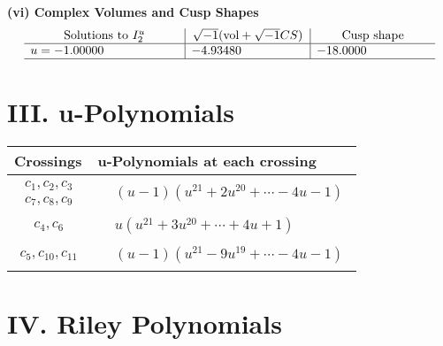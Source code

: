 \documentclass[1p]{elsarticle_modified}
\theoremstyle{definition}
\newcommand{\I}{\sqrt{-1}}
\begin{document}
\newpage\flushleft \textbf{(vi) Complex Volumes and Cusp Shapes}
$$\begin{array}{c|c|c}  
\text{Solutions to }I^u_{2}& \I (\text{vol} + \sqrt{-1}CS) & \text{Cusp shape}\\
 \hline 
\begin{aligned}
u &= -1.00000\phantom{ +0.000000I}\end{aligned}
 & -4.93480\phantom{ +0.000000I} & -18.0000\phantom{ +0.000000I}\\
 \hline 
 \end{array}$$\newpage
\newpage\renewcommand{\arraystretch}{1}
\centering \section*{ III. u-Polynomials}
\begin{tabular}{m{50pt}|m{274pt}}
Crossings & \hspace{64pt}u-Polynomials at each crossing \\
\hline $$\begin{aligned}c_{1},c_{2},c_{3}\\c_{7},c_{8},c_{9}\end{aligned}$$&$\begin{aligned}
&(u-1)(u^{21}+2 u^{20}+\cdots-4 u-1)
\end{aligned}$\\
\hline $$\begin{aligned}c_{4},c_{6}\end{aligned}$$&$\begin{aligned}
&u(u^{21}+3 u^{20}+\cdots+4 u+1)
\end{aligned}$\\
\hline $$\begin{aligned}c_{5},c_{10},c_{11}\end{aligned}$$&$\begin{aligned}
&(u-1)(u^{21}-9 u^{19}+\cdots-4 u-1)
\end{aligned}$\\
\hline
\end{tabular}\newpage\renewcommand{\arraystretch}{1}
\centering \section*{ IV. Riley Polynomials}
\end{document}
